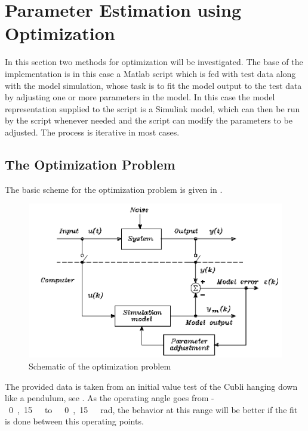 \section{Parameter Estimation using Optimization}\label{sec:parameterEstimationUsingOptimization}
In this section two methods for optimization will be investigated. The base of the implementation is in this case a Matlab script which is fed with test data along with the model simulation, whose task is to fit the model output to the test data by adjusting one or more parameters in the model. In this case the model representation supplied to the script is a Simulink model, which can then be run by the script whenever needed and the script can modify the parameters to be adjusted. The process is iterative in most cases.

\subsection{The Optimization Problem}
The basic scheme for the optimization problem is given in .
%
\begin{figure}[H]
	\centering
	\includegraphics[scale=0.4]{figures/SensToolSchema}
	\caption{Schematic of the optimization problem}
	\label{SensToolSchema}
\end{figure}
%
The provided data is taken from an initial value test of the Cubli hanging down like a pendulum, see .
As the operating angle goes from \si{-0,15\ to\ 0,15\ rad}, the behavior at this range will be better if the fit is done between this operating points. 

